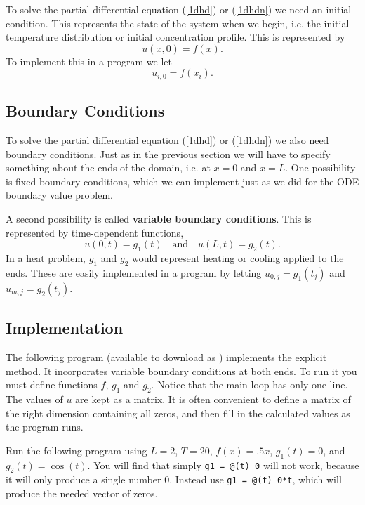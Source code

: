 To solve the partial differential equation (\ref{1dhd}) or (\ref{1dhdn})
we need an initial condition. This represents the state of the system when
we begin, i.e. the initial temperature distribution or initial
concentration profile. This is represented by
$$
  u(x,0) = f(x).
$$
To implement this in a program we let
$$
    u_{i,0} = f(x_i).
$$


\subsection*{Boundary Conditions}

To solve the partial differential equation (\ref{1dhd}) or
(\ref{1dhdn}) we also need boundary conditions. Just as in the
previous section we will have to specify something about the ends of
the domain, i.e. at $x = 0$ and $x = L$. One possibility is fixed
boundary conditions, which we can implement just as we did for the ODE
boundary value problem.

A second possibility is called {\bf variable boundary conditions}.
This is represented by time-dependent functions,
$$
u(0,t) = g_1(t)  \quad\text{and}\quad u(L,t) = g_2(t).
$$
In a heat problem, $g_1$ and $g_2$ would represent heating or cooling
applied to the ends.
These are easily implemented in a program by letting
$u_{0,j} = g_1(t_j)$ and $u_{m,j} = g_2(t_j)$.


\subsection*{Implementation}

The following program (available to download as ) implements the
explicit method.  It incorporates variable boundary conditions at both
ends. To run it you must define functions $f$, $g_1$ and $g_2$.
Notice that the main loop has only one line. The values of $u$ are
kept as a matrix. It is often convenient to define a
matrix of the right dimension containing all zeros, and then fill in
the calculated values as the program runs.

Run the following program using $L = 2$, $T=20$, $f(x) = .5 x$, $g_1(t) = 0$,
and $g_2(t) = \cos(t)$. You will find that simply \verb&g1 = @(t) 0& will not
work, because it will only produce a single number $0$. Instead use \verb&g1 = @(t) 0*t&,
which will produce the needed vector of zeros.
\newpage


